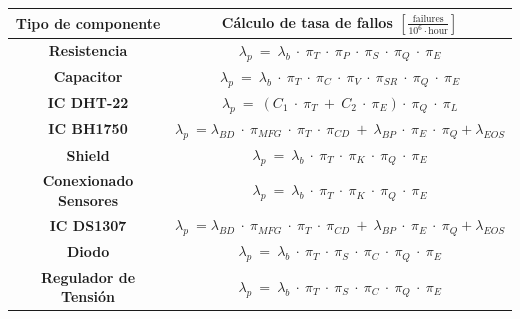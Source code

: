 \begin{table}[H]
\centering
\begin{tabular}{|c|c|}
\hline
\textbf{Tipo de componente}   & \textbf{Cálculo de tasa de fallos $\left[\frac{\text{failures}}{10^6 \cdot \text{hour}}\right]$}                                                                               \\ \hline
\textbf{Resistencia}          & $\lambda_p \ = \ \lambda_b \ \cdot \  \pi_T \ \cdot \ \pi_P \ \cdot \ \pi_S \ \cdot \ \pi_Q \ \cdot \ \pi_E$                                                                   \\ \hline
\textbf{Capacitor}            & $\lambda_p \ = \ \lambda_b \ \cdot \  \pi_T \ \cdot \ \pi_C \ \cdot \ \pi_V \ \cdot \ \pi_{SR} \ \cdot \ \pi_Q \ \cdot \ \pi_E  $                                              \\ \hline
\textbf{IC DHT-22}            & $\lambda_p \ = \  (C_1 \ \cdot \ \pi_T \ + \ C_2 \ \cdot \ \pi_E ) \cdot \ \pi_Q \ \cdot \ \pi_L  $                                                                            \\ \hline
\textbf{IC BH1750}            & $\lambda_p \ = \lambda_{BD} \ \cdot \ \pi_{MFG} \ \cdot \ \pi_T \ \cdot \ \pi_{CD} \ + \ \lambda_{BP} \ \cdot \ \pi_E \ \cdot \ \pi_Q + \lambda_{EOS}$                         \\ \hline
\textbf{Shield}               & $\lambda_p \ = \ \lambda_b \ \cdot \  \pi_T \ \cdot \ \pi_K  \ \cdot \ \pi_Q \ \cdot \ \pi_E $                                                                                 \\ \hline
\textbf{Conexionado Sensores} & $\lambda_p \ = \ \lambda_b \ \cdot \  \pi_T \ \cdot \ \pi_K  \ \cdot \ \pi_Q \ \cdot \ \pi_E $                                                                                 \\ \hline
\textbf{IC DS1307}            & $\lambda_p \ = \lambda_{BD} \ \cdot \ \pi_{MFG} \ \cdot \ \pi_T \ \cdot \ \pi_{CD} \ + \ \lambda_{BP} \ \cdot \ \pi_E \ \cdot \ \pi_Q + \lambda_{EOS}$                         \\ \hline
\textbf{Diodo}                & $\lambda_p \ = \ \lambda_b \ \cdot \  \pi_T \ \cdot \ \pi_S  \ \cdot \ \pi_C \ \cdot \ \pi_Q \ \cdot \ \pi_E $                                                                 \\ \hline
\textbf{Regulador de Tensión} & $\lambda_p \ = \ \lambda_b \ \cdot \  \pi_T \ \cdot \ \pi_S  \ \cdot \ \pi_C \ \cdot \ \pi_Q \ \cdot \ \pi_E $                                                                 \\ \hline

\end{tabular}
\end{table}
